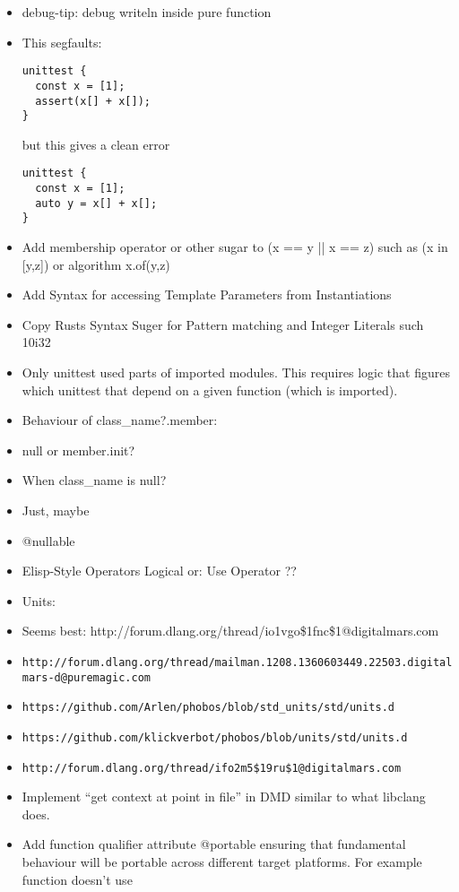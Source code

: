 \documentclass[xcolor=dvipsnames, twocolumn]{article}
\begin{document}
\begin{itemize}

\item debug-tip: debug writeln inside pure function

\item This segfaults:
\begin{lstlisting}[frame=single]
unittest {
  const x = [1];
  assert(x[] + x[]);
}
\end{lstlisting}
but this gives a clean error
\begin{lstlisting}[frame=single]
unittest {
  const x = [1];
  auto y = x[] + x[];
}
\end{lstlisting}

\item Add membership operator or other sugar to (x == y || x == z) such as (x in
  [y,z]) or algorithm x.of(y,z)
\item Add Syntax for accessing Template Parameters from Instantiations
\item Copy Rusts Syntax Suger for Pattern matching and Integer Literals such 10i32
\item Only unittest used parts of imported modules. This requires logic that
  figures which unittest that depend on a given function (which is imported).
\item Behaviour of class\_name?.member:
\item null or member.init?
\item When class\_name is null?
\item Just, maybe
\item @nullable
\item Elisp-Style Operators Logical or: Use Operator ??
\item Units:
\item Seems best: http://forum.dlang.org/thread/io1vgo\$1fnc\$1@digitalmars.com
\item
  \texttt{http://forum.dlang.org/thread/mailman.1208.1360603449.22503.digitalmars-d@puremagic.com}
\item \texttt{https://github.com/Arlen/phobos/blob/std\_units/std/units.d}
\item \texttt{https://github.com/klickverbot/phobos/blob/units/std/units.d}
\item \texttt{http://forum.dlang.org/thread/ifo2m5\$19ru\$1@digitalmars.com}
\item Implement “get context at point in file” in DMD similar to what libclang
  does.
\item Add function qualifier attribute @portable ensuring that fundamental
  behaviour will be portable across different target platforms. For example
  function doesn't use


\end{itemize}
\end{document}
